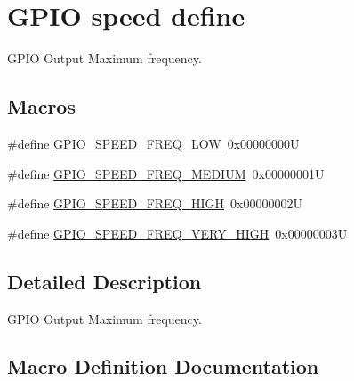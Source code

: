 \hypertarget{group___g_p_i_o__speed__define}{}\section{G\+P\+IO speed define}
\label{group___g_p_i_o__speed__define}


G\+P\+IO Output Maximum frequency.  


\subsection*{Macros}
\begin{DoxyCompactItemize}
\item 
\#define \hyperlink{group___g_p_i_o__speed__define_gab7916c4265bfa1b26a5205ea9c1caa4e}{G\+P\+I\+O\+\_\+\+S\+P\+E\+E\+D\+\_\+\+F\+R\+E\+Q\+\_\+\+L\+OW}~0x00000000U
\item 
\#define \hyperlink{group___g_p_i_o__speed__define_ga1724a25a9cf00ebf485daeb09cfa1e25}{G\+P\+I\+O\+\_\+\+S\+P\+E\+E\+D\+\_\+\+F\+R\+E\+Q\+\_\+\+M\+E\+D\+I\+UM}~0x00000001U
\item 
\#define \hyperlink{group___g_p_i_o__speed__define_gaef5898db71cdb957cd41f940b0087af8}{G\+P\+I\+O\+\_\+\+S\+P\+E\+E\+D\+\_\+\+F\+R\+E\+Q\+\_\+\+H\+I\+GH}~0x00000002U
\item 
\#define \hyperlink{group___g_p_i_o__speed__define_ga1944cf10e2ab172810d38b681d40b771}{G\+P\+I\+O\+\_\+\+S\+P\+E\+E\+D\+\_\+\+F\+R\+E\+Q\+\_\+\+V\+E\+R\+Y\+\_\+\+H\+I\+GH}~0x00000003U
\end{DoxyCompactItemize}


\subsection{Detailed Description}
G\+P\+IO Output Maximum frequency. 



\subsection{Macro Definition Documentation}
\mbox{\label{group___g_p_i_o__speed__define_gaef5898db71cdb957cd41f940b0087af8}} 
